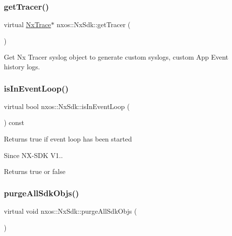 \subsubsection{\texorpdfstring{get\+Tracer()}{getTracer()}}
{\footnotesize\ttfamily virtual \mbox{\hyperlink{classnxos_1_1_nx_trace}{Nx\+Trace}}$\ast$ nxos\+::\+Nx\+Sdk\+::get\+Tracer (\begin{DoxyParamCaption}{ }\end{DoxyParamCaption})\hspace{0.3cm}{\ttfamily [pure virtual]}}

Get Nx Tracer syslog object to generate custom syslogs, custom App Event history logs. \mbox{\label{classnxos_1_1_nx_sdk_ae2a6d199227de068bda5a720a7f29e94}} 
\subsubsection{\texorpdfstring{is\+In\+Event\+Loop()}{isInEventLoop()}}
{\footnotesize\ttfamily virtual bool nxos\+::\+Nx\+Sdk\+::is\+In\+Event\+Loop (\begin{DoxyParamCaption}{ }\end{DoxyParamCaption}) const\hspace{0.3cm}{\ttfamily [pure virtual]}}

Returns true if event loop has been started

\begin{DoxySince}{Since}
N\+X-\/\+S\+DK V1..
\end{DoxySince}
\begin{DoxyReturn}{Returns}
true or false 
\end{DoxyReturn}
\mbox{\label{classnxos_1_1_nx_sdk_abfd0b2d92b51fc18bb30c059fa5b4a9b}} 
\subsubsection{\texorpdfstring{purge\+All\+Sdk\+Objs()}{purgeAllSdkObjs()}}
{\footnotesize\ttfamily virtual void nxos\+::\+Nx\+Sdk\+::purge\+All\+Sdk\+Objs (\begin{DoxyParamCaption}{ }\end{DoxyParamCaption})\hspace{0.3cm}{\ttfamily [pure virtual]}}

